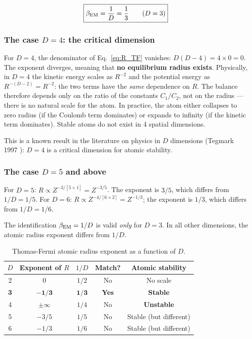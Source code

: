 \documentclass[10pt,a4paper]{article}
\begin{document}
\begin{equation}
\boxed{\beta_{\rm EM} = \frac{1}{D} = \frac{1}{3} \qquad (D = 3)}
\end{equation}

\subsubsection{The case $D = 4$: the critical dimension}

For $D = 4$, the denominator of Eq.~\ref{eq:R_TF} vanishes: $D(D-4) = 4 \times 0 = 0$. The exponent diverges, meaning that \textbf{no equilibrium radius exists}. Physically, in $D = 4$ the kinetic energy scales as $R^{-2}$ and the potential energy as $R^{-(D-2)} = R^{-2}$: the two terms have the \textit{same} dependence on $R$. The balance therefore depends only on the ratio of the constants $C_1/C_2$, not on the radius --- there is no natural scale for the atom. In practice, the atom either collapses to zero radius (if the Coulomb term dominates) or expands to infinity (if the kinetic term dominates). Stable atoms do not exist in 4 spatial dimensions.

This is a known result in the literature on physics in $D$ dimensions (Tegmark 1997 \cite{Tegmark1997}): $D = 4$ is a critical dimension for atomic stability.

\subsubsection{The case $D = 5$ and above}

For $D = 5$: $R \propto Z^{-3/[5 \times 1]} = Z^{-3/5}$. The exponent is $3/5$, which differs from $1/D = 1/5$. For $D = 6$: $R \propto Z^{-4/[6 \times 2]} = Z^{-1/3}$; the exponent is $1/3$, which differs from $1/D = 1/6$.

The identification $\beta_{\rm EM} = 1/D$ is valid \textit{only} for $D = 3$. In all other dimensions, the atomic radius exponent differs from $1/D$.

\begin{table}[h]
\centering
\caption{Thomas-Fermi atomic radius exponent as a function of $D$.}\label{tab:TF_D}
\begin{tabular}{ccccc}
\toprule
$D$ & Exponent of $R$ & $1/D$ & Match? & Atomic stability \\
\midrule
2 & $0$ & $1/2$ & No & No scale \\
\textbf{3} & $\boldsymbol{-1/3}$ & $\boldsymbol{1/3}$ & \textbf{Yes} & \textbf{Stable} \\
4 & $\pm\infty$ & $1/4$ & No & \textbf{Unstable} \\
5 & $-3/5$ & $1/5$ & No & Stable (but different) \\
6 & $-1/3$ & $1/6$ & No & Stable (but different) \\
\bottomrule
\end{tabular}
\end{table}
\end{document}
